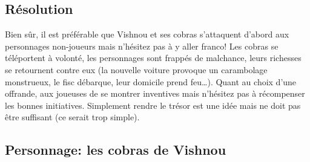 \subsection{Résolution}

Bien sûr, il est préférable que Vishnou et ses cobras s'attaquent d'abord aux personnages non-joueurs mais n'hésitez pas à y aller franco!
Les cobras se téléportent à volonté, les personnages sont frappés de malchance, leurs richesses se retournent contre eux (la nouvelle voiture provoque un carambolage monstrueux, le fisc débarque, leur domicile prend feu\dots).
Quant au choix d'une offrande, aux joueuses de se montrer inventives mais n'hésitez pas à récompenser les bonnes initiatives.
Simplement \og rendre \fg le trésor est une idée mais ne doit pas être suffisant (ce serait trop simple).

\subsection*{Personnage: les cobras de Vishnou}

\vfill
{}
\vfill
